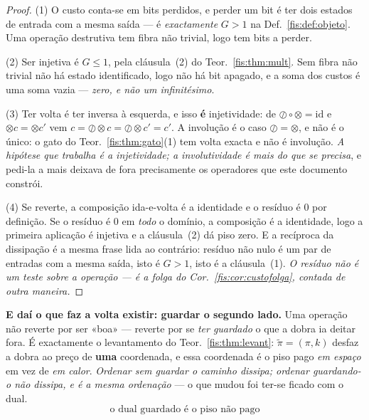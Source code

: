 \documentclass[livro.tex]{subfiles}
\begin{document}
\begin{proof}
(1) O custo conta-se em bits perdidos, e perder um bit é ter dois estados de
entrada com a mesma saída --- é \emph{exactamente} $G>1$ na
Def.~\ref{fis:def:objeto}. Uma operação destrutiva tem fibra não trivial, logo
tem bits a perder.

(2) Ser injetiva é $G\le1$, pela cláusula~(2) do Teor.~\ref{fis:thm:mult}. Sem
fibra não trivial não há estado identificado, logo não há bit apagado, e a soma
dos custos é uma soma vazia --- \emph{zero, e não um infinitésimo}.

(3) Ter volta é ter inversa à esquerda, e isso \textbf{é} injetividade: de
$\oslash\circ\otimes=\mathrm{id}$ e $\otimes c=\otimes c'$ vem
$c=\oslash\otimes c=\oslash\otimes c'=c'$. A involução é o caso
$\oslash=\otimes$, e não é o único: o gato do Teor.~\ref{fis:thm:gato}(1) tem
volta exacta e não é involução. \emph{A hipótese que trabalha é a injetividade; a
involutividade é mais do que se precisa}, e pedi-la a mais deixava de fora
precisamente os operadores que este documento constrói.

(4) Se reverte, a composição ida-e-volta é a identidade e o resíduo é $0$ por
definição. Se o resíduo é $0$ em \emph{todo} o domínio, a composição é a
identidade, logo a primeira aplicação é injetiva e a cláusula~(2) dá piso zero. E
a recíproca da dissipação é a mesma frase lida ao contrário: resíduo não nulo é
um par de entradas com a mesma saída, isto é $G>1$, isto é a cláusula~(1).
\emph{O resíduo não é um teste sobre a operação --- é a folga do
Cor.~\ref{fis:cor:custofolga}, contada de outra maneira.}
\end{proof}

\medskip\noindent\textbf{E daí o que faz a volta existir: guardar o segundo
lado.} Uma operação não reverte por ser «boa» --- reverte por se \emph{ter
guardado} o que a dobra ia deitar fora. É exactamente o levantamento do
Teor.~\ref{fis:thm:levant}: $\tilde\pi=(\pi,k)$ desfaz a dobra ao preço de
\textbf{uma} coordenada, e essa coordenada é o piso pago \emph{em espaço} em vez
de \emph{em calor}. \emph{Ordenar sem guardar o caminho dissipa; ordenar
guardando-o não dissipa, e é a mesma ordenação} --- o que mudou foi ter-se ficado
com o dual.
\[
\boxed{\;\text{o dual guardado é o piso não pago}\;}
\]
\end{document}
